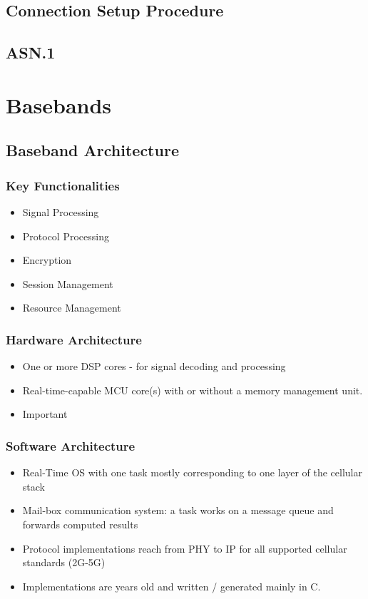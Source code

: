 \subsection{Connection Setup Procedure}

\subsection{ASN.1}

\section{Basebands}

\subsection{Baseband Architecture}

\subsubsection{Key Functionalities}
\begin{itemize}
  \item Signal Processing
  \item Protocol Processing
  \item Encryption 
  \item Session Management
  \item Resource Management
\end{itemize}

\subsubsection{Hardware Architecture}
\begin{itemize}
  \item One or more DSP cores - for signal decoding and processing
  \item Real-time-capable MCU core(s) with or without a memory management unit.
  \item Important 
\end{itemize}

\subsubsection{Software Architecture}
\begin{itemize}
  \item Real-Time OS with one task mostly corresponding to one layer of the cellular stack
  \item Mail-box communication system: a task works on a message queue and forwards computed results
  \item Protocol implementations reach from PHY to IP for all supported cellular standards (2G-5G)
  \item Implementations are years old and written / generated mainly in C.
\end{itemize}

